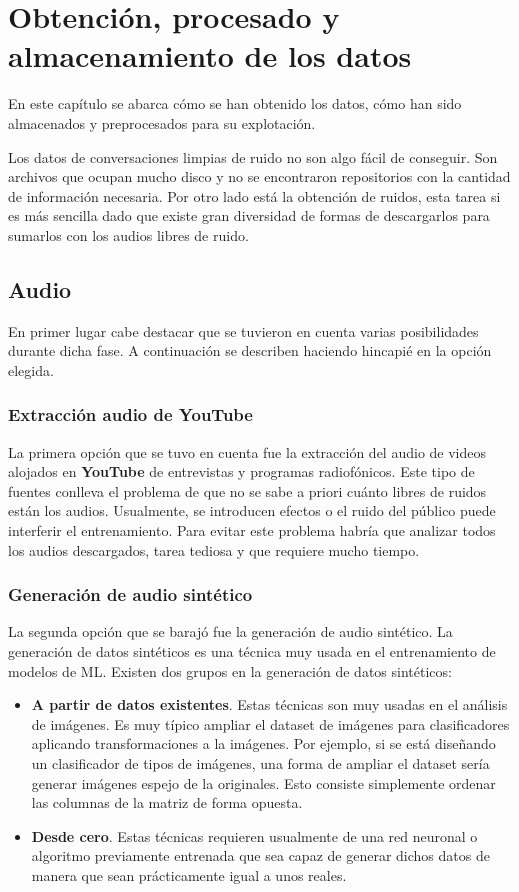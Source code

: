 \chapter{Obtención, procesado y almacenamiento de los datos} \label{cp: dataGathering}
En este capítulo se abarca cómo se han obtenido los datos, cómo han sido almacenados y preprocesados para su explotación.

Los datos de conversaciones limpias de ruido no son algo fácil de conseguir. Son archivos que ocupan mucho disco y no se encontraron repositorios con la cantidad de información necesaria. Por otro lado está la obtención de ruidos, esta tarea si es más sencilla dado que existe gran diversidad de formas de descargarlos para sumarlos con los audios libres de ruido.

\section{Audio}
En primer lugar cabe destacar que se tuvieron en cuenta varias posibilidades durante dicha fase. A continuación se describen haciendo hincapié en la opción elegida.

\subsection{Extracción audio de YouTube}
La primera opción que se tuvo en cuenta fue la extracción del audio de videos alojados en \textbf{YouTube} de entrevistas y programas radiofónicos. Este tipo de fuentes conlleva el problema de que no se sabe a priori cuánto libres de ruidos están los audios. Usualmente, se introducen efectos o el ruido del público puede interferir el entrenamiento. Para evitar este problema habría que analizar todos los audios descargados, tarea tediosa y que requiere mucho tiempo.

\subsection{Generación de audio sintético}
La segunda opción que se barajó fue la generación de audio sintético. La generación de datos sintéticos es una técnica muy usada en el entrenamiento de modelos de \gls{ML}. Existen dos grupos en la generación de datos sintéticos:
\begin{itemize}
	\item \textbf{A partir de datos existentes}. Estas técnicas son muy usadas en el análisis de imágenes. Es muy típico ampliar el \MakeLowercase{\gls{dataset}} de imágenes para clasificadores aplicando transformaciones a la imágenes. Por ejemplo, si se está diseñando un clasificador de tipos de imágenes, una forma de ampliar el \gls{dataset} sería generar imágenes espejo de la originales. Esto consiste simplemente ordenar las columnas de la matriz de forma opuesta.
	\item \textbf{Desde cero}. Estas técnicas requieren usualmente de una red neuronal o algoritmo previamente entrenada que sea capaz de generar dichos datos de manera que sean prácticamente igual a unos reales.
\end{itemize}

